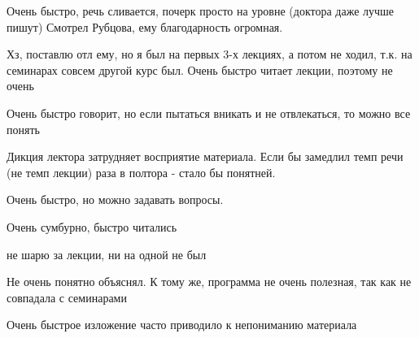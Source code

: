             \begin{commentbox} 
                Очень быстро, речь сливается, почерк просто на уровне (доктора даже лучше пишут) Смотрел Рубцова, ему благодарность огромная. 
            \end{commentbox} 
        
            \begin{commentbox} 
                Хз, поставлю отл ему, но я был на первых 3-х лекциях, а потом не ходил, т.к. на семинарах совсем другой курс был. Очень быстро читает лекции, поэтому не очень  
            \end{commentbox} 
        
            \begin{commentbox} 
                Очень быстро говорит, но если пытаться вникать и не отвлекаться, то можно все понять 
            \end{commentbox} 
        
            \begin{commentbox} 
                Дикция лектора затрудняет восприятие материала. Если бы замедлил темп речи (не темп лекции) раза в полтора - стало бы понятней. 
            \end{commentbox} 
        
            \begin{commentbox} 
                Очень быстро, но можно задавать вопросы. 
            \end{commentbox} 
        
            \begin{commentbox} 
                Очень сумбурно, быстро читались 
            \end{commentbox} 
        
            \begin{commentbox} 
                не шарю за лекции, ни на одной не был 
            \end{commentbox} 
        
            \begin{commentbox} 
                Не очень понятно объяснял. К тому же, программа не очень полезная, так как не совпадала с семинарами 
            \end{commentbox} 
        
            \begin{commentbox} 
                Очень быстрое изложение часто приводило к непониманию материала 
            \end{commentbox} 
        

